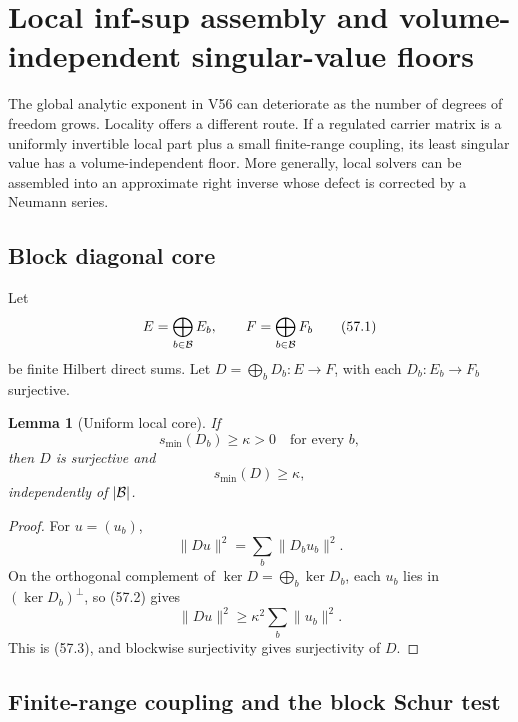 \documentclass[11pt]{article}
\newtheorem{lemma}[theorem]{Lemma}
\begin{document}

\section{Local inf-sup assembly and volume-independent singular-value
floors}
\label{sec:v11v57}

The global analytic exponent in V56 can deteriorate as the number of
degrees of freedom grows.  Locality offers a different route.  If a
regulated carrier matrix is a uniformly invertible local part plus a
small finite-range coupling, its least singular value has a
volume-independent floor.  More generally, local solvers can be
assembled into an approximate right inverse whose defect is corrected
by a Neumann series.

\subsection{Block diagonal core}

Let
\[
                 E=\bigoplus_{b\in{\cal B}}E_b,\qquad
                 F=\bigoplus_{b\in{\cal B}}F_b                 \tag{57.1}
\]
be finite Hilbert direct sums.  Let
\(D=\bigoplus_bD_b:E\to F\), with each
\(D_b:E_b\to F_b\) surjective.

\begin{lemma}[Uniform local core]
\label{lem:v11v57-core}
If
\[
                           s_{\min}(D_b)\ge\kappa>0
                           \quad\text{for every }b,            \tag{57.2}
\]
then \(D\) is surjective and
\[
                              s_{\min}(D)\ge\kappa,            \tag{57.3}
\]
independently of \(|{\cal B}|\).
\end{lemma}

\begin{proof}
For \(u=(u_b)\),
\[
                         \lVert Du\rVert^2
                    =\sum_b\lVert D_bu_b\rVert^2.
\]
On the orthogonal complement of \(\ker D=\bigoplus_b\ker D_b\),
each \(u_b\) lies in \((\ker D_b)^\perp\), so (57.2) gives
\[
                         \lVert Du\rVert^2
                    \ge\kappa^2\sum_b\lVert u_b\rVert^2.
\]
This is (57.3), and blockwise surjectivity gives surjectivity of \(D\).
\end{proof}

\subsection{Finite-range coupling and the block Schur test}
\end{document}

